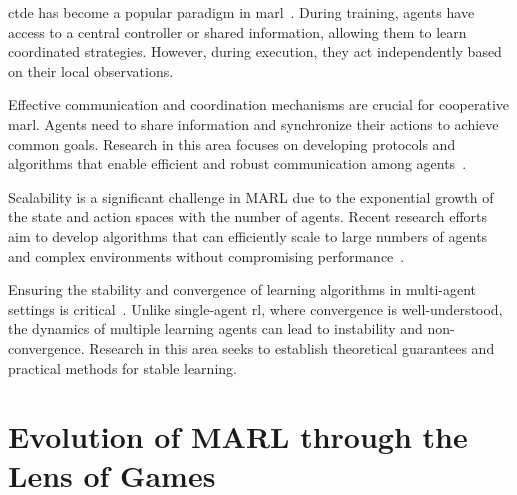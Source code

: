 \Gls{ctde} has become a popular paradigm in \gls{marl}~\cite{rashid2018,foerster2017,lowe2020}. 
During training, agents have access to a central controller or shared information, 
allowing them to learn coordinated strategies. 
However, during execution, they act independently based on their local observations.

Effective communication and coordination mechanisms are crucial for cooperative \gls{marl}. 
Agents need to share information and synchronize their actions to achieve common goals. 
Research in this area focuses on developing protocols and algorithms that enable efficient and 
robust communication among agents~\cite{sukhbaatar2016,fotouhi2019,hoang2023}.

Scalability is a significant challenge in MARL due to the exponential growth of the state and 
action spaces with the number of agents\cite{cao2012,busoniu2008}. 
Recent research efforts aim to develop algorithms that can efficiently scale to large numbers 
of agents and complex environments without compromising performance~\cite{smit2023,sun2023}.

Ensuring the stability and convergence of learning algorithms in multi-agent settings is 
critical~\cite{papoudakis2021}. 
Unlike single-agent \gls{rl}, where convergence is well-understood, 
the dynamics of multiple learning agents can lead to instability and non-convergence.
Research in this area seeks to establish theoretical guarantees and practical methods 
for stable learning.

\section{Evolution of MARL through the Lens of Games}

